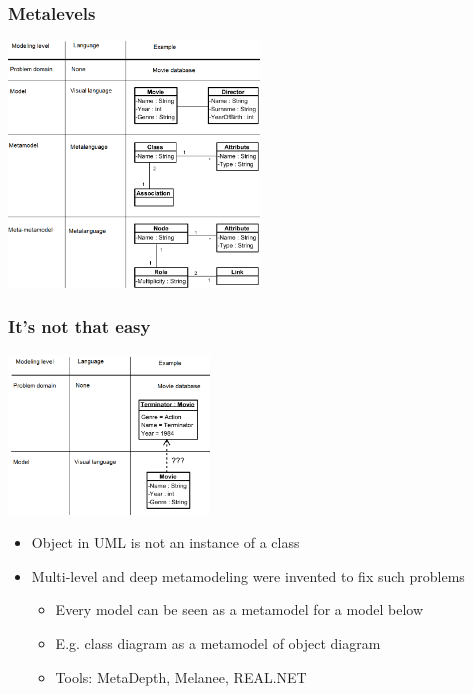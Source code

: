 \documentclass{slides-style}
\begin{document}
    \begin{frame}
        \frametitle{Metalevels}
        \begin{center}
            \includegraphics[width=0.5\textwidth]{metalevels-en.png}
        \end{center}
    \end{frame}

    \begin{frame}
        \frametitle{It's not that easy}
        \begin{center}
            \includegraphics[width=0.4\textwidth]{terminator-en.png}
        \end{center}
        \begin{itemize}
            \item Object in UML is not an instance of a class
            \item Multi-level and deep metamodeling were invented to fix such problems
            \begin{itemize}
                \item Every model can be seen as a metamodel for a model below
                \item E.g. class diagram as a metamodel of object diagram
                \item Tools: MetaDepth, Melanee, REAL.NET
            \end{itemize}
        \end{itemize}
    \end{frame}
\end{document}
